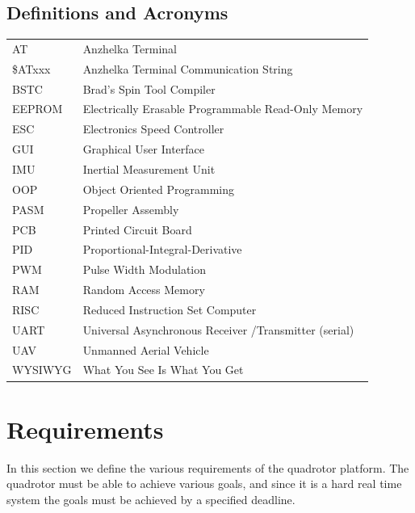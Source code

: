 \documentclass{article}
\numberwithin{equation}{section} %
\begin{document}
\subsection{Definitions and Acronyms}
\begin{tabular}{l l}
	AT & Anzhelka Terminal \\
	\$ATxxx & Anzhelka Terminal Communication String \\
	BSTC & Brad's Spin Tool Compiler \\
	EEPROM & Electrically Erasable Programmable Read-Only Memory \\
	ESC & Electronics Speed Controller \\
	GUI & Graphical User Interface \\
	IMU & Inertial Measurement Unit \\
	OOP & Object Oriented Programming \\
	PASM & Propeller Assembly \\
	PCB & Printed Circuit Board \\
	PID & Proportional-Integral-Derivative \\
	PWM & Pulse Width Modulation \\
	RAM & Random Access Memory \\
	RISC & Reduced Instruction Set Computer\\
	UART & Universal Asynchronous Receiver /Transmitter (serial) \\
	UAV & Unmanned Aerial Vehicle \\
	WYSIWYG & What You See Is What You Get \\
\end{tabular}



\section{Requirements}
In this section we define the various requirements of the quadrotor platform. The quadrotor must be able to achieve various goals, and since it is a hard real time system the goals must be achieved by a specified deadline.


\end{document}
